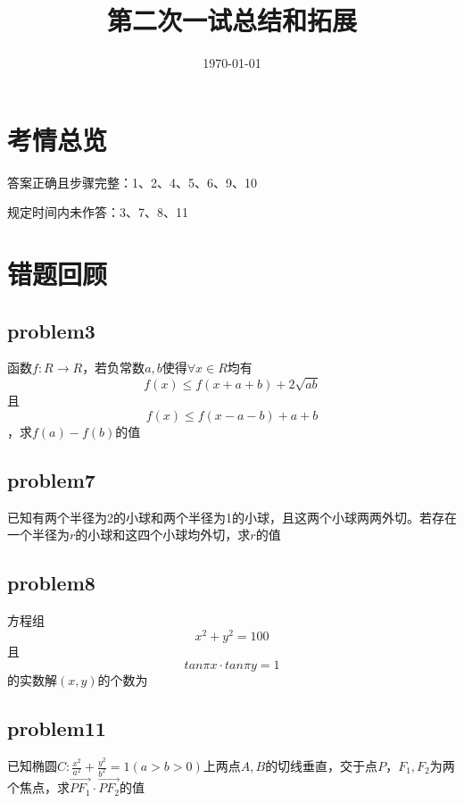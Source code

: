 \documentclass[12pt]{ctexart}
\title{第二次一试总结和拓展}
\date{\today}
\begin{document}
\maketitle
\section{考情总览}

答案正确且步骤完整：1、2、4、5、6、9、10

规定时间内未作答：3、7、8、11


\vspace{10cm}
\section{错题回顾}

\subsection{problem3}
    函数$f:R \rightarrow R$，若负常数$a,b$使得$\forall x\in R$均有
    $$f(x)\leq f(x+a+b)+2\sqrt{ab}$$且
    $$f(x)\leq f(x-a-b)+a+b$$，求$f(a)-f(b)$的值
\vspace{15cm}
\subsection{problem7}
    已知有两个半径为2的小球和两个半径为1的小球，且这两个小球两两外切。若存在一个半径为$r$的小球和这四个小球均外切，求$r$的值
\vspace{15cm}
\subsection{problem8}
    方程组$$x^2+y^2=100$$ 且$$tan \pi x \cdot tan \pi y = 1$$
    的实数解$(x,y)$的个数为
\vspace{15cm}
\subsection{problem11}
    已知椭圆$C:\frac{x^2}{a^2} + \frac{y^2}{b^2} =1(a>b>0)$上两点$A,B$的切线垂直，交于点$P$，$F_1,F_2$为两个焦点，求$\vec{PF_1}\cdot\vec{PF_2}$的值
\end{document}
